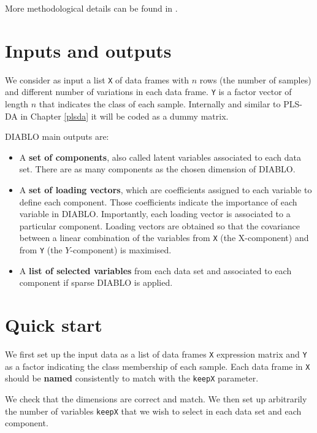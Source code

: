 \documentclass[]{book}
\theoremstyle{definition}
\theoremstyle{definition}
\theoremstyle{definition}
\theoremstyle{remark}
\begin{document}
More methodological details can be found in \citep{Sin16}.

\section{Inputs and outputs}\label{inputs-and-outputs-2}

We consider as input a list \texttt{X} of data frames with \(n\) rows
(the number of samples) and different number of variations in each data
frame. \texttt{Y} is a factor vector of length \(n\) that indicates the
class of each sample. Internally and similar to PLS-DA in Chapter
\ref{plsda} it will be coded as a dummy matrix.

DIABLO main outputs are:

\begin{itemize}
\item
  A \textbf{set of components}, also called latent variables associated
  to each data set. There are as many components as the chosen dimension
  of DIABLO.
\item
  A \textbf{set of loading vectors}, which are coefficients assigned to
  each variable to define each component. Those coefficients indicate
  the importance of each variable in DIABLO. Importantly, each loading
  vector is associated to a particular component. Loading vectors are
  obtained so that the covariance between a linear combination of the
  variables from \texttt{X} (the X-component) and from \texttt{Y} (the
  \(Y\)-component) is maximised.
\item
  A \textbf{list of selected variables} from each data set and
  associated to each component if sparse DIABLO is applied.
\end{itemize}

\section{Quick start}\label{quick-start-3}

We first set up the input data as a list of data frames \texttt{X}
expression matrix and \texttt{Y} as a factor indicating the class
membership of each sample. Each data frame in \texttt{X} should be
\textbf{named} consistently to match with the \texttt{keepX} parameter.

We check that the dimensions are correct and match. We then set up
arbitrarily the number of variables \texttt{keepX} that we wish to
select in each data set and each component.
\end{document}
